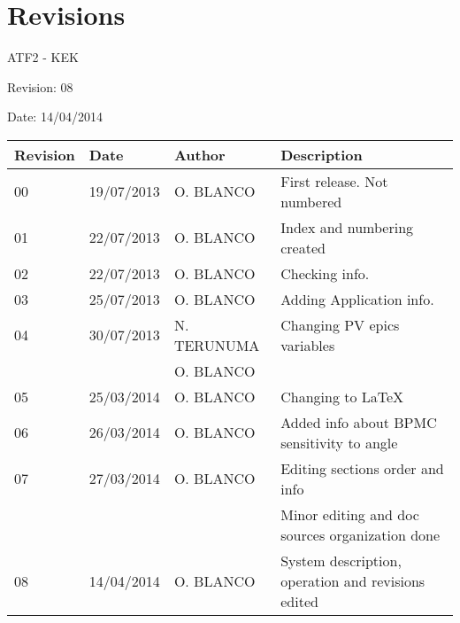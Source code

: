 \section{Revisions}
ATF2 - KEK\par
Revision: 08\par
Date: 14/04/2014\par
\begin{tabular}{|l|l|l|l|}\hline
Revision&Date&Author&Description\\\hline\hline
00&19/07/2013&O. BLANCO&First release. Not numbered\\\hline
01&22/07/2013&O. BLANCO&Index and numbering created\\\hline
02&22/07/2013&O. BLANCO&Checking info.\\\hline
03&25/07/2013&O. BLANCO&Adding Application info.\\\hline
04&30/07/2013&N. TERUNUMA&Changing PV epics variables\\
&&O. BLANCO&\\\hline
05&25/03/2014&O. BLANCO&Changing to \LaTeX\\\hline
06&26/03/2014&O. BLANCO&Added info about BPMC sensitivity to angle\\\hline
07&27/03/2014&O. BLANCO&Editing sections order and info\\
&&&Minor editing and doc sources organization done\\\hline
08&14/04/2014&O. BLANCO&System description, operation and revisions edited\\\hline
\end{tabular}


